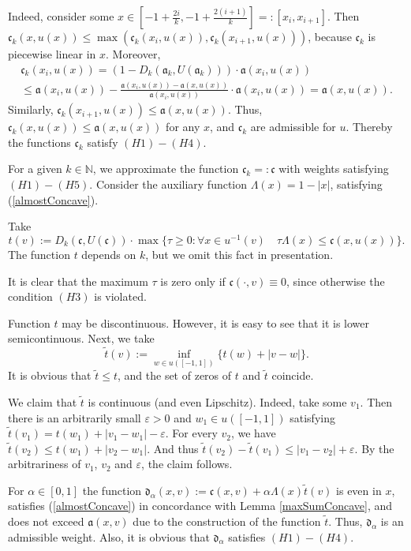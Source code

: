 \documentclass[12pt]{article}
\newcommand{\Nat}{\mathbb N}
\newcommand{\abs}[1]{\left\vert#1\right\vert}
\newcommand{\eps}{\varepsilon}
\renewcommand{\ge}{\geqslant}
\renewcommand{\le}{\leqslant}
\begin{document}
Indeed, consider some
$x \in [-1 + \frac{2i}{k}, -1 + \frac{2(i + 1)}{k}] =: [x_i, x_{i + 1}]$.
Then $\mathfrak c_k(x, u(x)) \le \max( \mathfrak c_k(x_i, u(x)), \mathfrak c_k(x_{i + 1}, u(x)) )$, because
$\mathfrak c_k$ is piecewise linear in $x$. Moreover,
\begin{multline*}
\mathfrak c_k(x_i, u(x)) = ( 1 - D_k(\mathfrak a_k, U(\mathfrak a_k))) \cdot \mathfrak a(x_i, u(x)) \\
\le \mathfrak a(x_i, u(x)) - \frac{\mathfrak a(x_i, u(x)) - \mathfrak a(x, u(x))}{\mathfrak a(x_i, u(x))} \cdot \mathfrak a(x_i, u(x)) = \mathfrak a(x, u(x)).
\end{multline*}
Similarly, $\mathfrak c_k(x_{i + 1}, u(x)) \le \mathfrak a(x, u(x))$.
Thus, $\mathfrak c_k(x, u(x)) \le \mathfrak a(x, u(x))$ for any $x$, and $\mathfrak c_k$ are admissible for $u$.
Thereby the functions $\mathfrak c_k$ satisfy $(H1)-(H4)$.

For a given $k \in \Nat$, we approximate the function $\mathfrak c_k =: \mathfrak c$ with weights satisfying $(H1)-(H5)$.
Consider the auxiliary function $\Lambda(x) = 1 - \abs{x}$, satisfying (\ref{almostConcave}).

Take
$$t(v):=D_k(\mathfrak c, U(\mathfrak c)) \cdot \max\{\tau \ge 0: \forall x \in u^{-1}(v) \quad \tau \Lambda(x) \le \mathfrak c(x, u(x))\}.$$
The function $t$ depends on $k$, but we omit this fact in presentation.

It is clear that the maximum $\tau$ is zero only if $\mathfrak c(\cdot, v) \equiv 0$,
since otherwise the condition $(H3)$ is violated.

Function $t$ may be discontinuous. However, it is easy to see that it is lower semicontinuous.
Next, we take
$$\tilde{t}(v) := \inf_{w \in u([-1, 1])} \{t(w) + |v - w|\}.$$
It is obvious that $\tilde{t} \le t$, and the set of zeros of $t$ and $\tilde{t}$ coincide.

We claim that $\tilde{t}$ is continuous (and even Lipschitz).
Indeed, take some $v_1$.
Then there is an arbitrarily small $\eps > 0$ and $w_1 \in u([-1, 1])$
satisfying $\tilde{t}(v_1) = t(w_1) + |v_1 - w_1| - \eps$.
For every $v_2$, we have $\tilde{t}(v_2) \le t(w_1) + |v_2 - w_1|$.
And thus $\tilde{t}(v_2) - \tilde{t}(v_1) \le |v_1 - v_2| + \eps$.
By the arbitrariness of $v_1$, $v_2$ and $\eps$, the claim follows.

For $\alpha \in [0, 1]$ the function $\mathfrak d_\alpha(x, v) := \mathfrak c(x, v) + \alpha \Lambda(x) \tilde{t}(v)$
is even in $x$, satisfies (\ref{almostConcave}) in concordance with Lemma \ref{maxSumConcave},
and does not exceed $\mathfrak a(x, v)$ due to the construction of the function $\tilde{t}$.
Thus, $\mathfrak d_\alpha$ is an admissible weight.
Also, it is obvious that $\mathfrak d_\alpha$ satisfies $(H1)-(H4)$.
\end{document}
